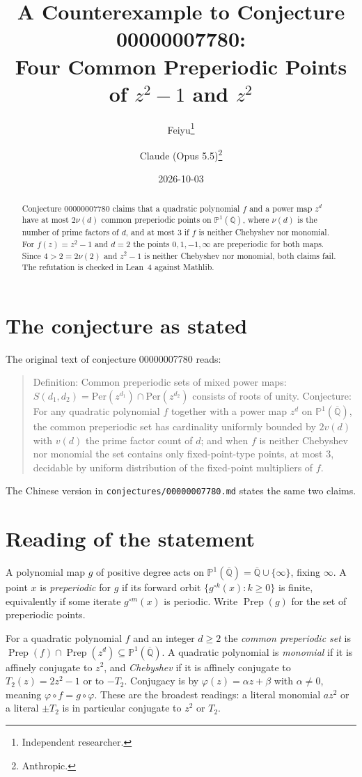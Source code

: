 \documentclass[11pt]{article}
\title{A Counterexample to Conjecture 00000007780:\\
Four Common Preperiodic Points of $z^2-1$ and $z^2$}
\author{%
  Feiyu\thanks{Independent researcher.}
  \and
  Claude (Opus 5.5)\thanks{Anthropic.}%
}
\date{2026-10-03}
\theoremstyle{plain}
\theoremstyle{definition}
\theoremstyle{remark}
\newcommand{\Qb}{\overline{\mathbb Q}}
\newcommand{\PP}{\mathbb P^1(\Qb)}
\newcommand{\Prep}{\operatorname{Prep}}
\begin{document}
\maketitle

\begin{abstract}
Conjecture 00000007780 claims that a quadratic polynomial $f$ and a power map $z^d$
have at most $2\nu(d)$ common preperiodic points on $\PP$, where $\nu(d)$ is the
number of prime factors of $d$, and at most $3$ if $f$ is neither Chebyshev nor
monomial. For $f(z)=z^2-1$ and $d=2$ the points $0,1,-1,\infty$ are preperiodic for
both maps. Since $4>2=2\nu(2)$ and $z^2-1$ is neither Chebyshev nor monomial, both
claims fail. The refutation is checked in Lean~4 against Mathlib.
\end{abstract}

\section{The conjecture as stated}

The original text of conjecture 00000007780 reads:

\begin{quote}
Definition: Common preperiodic sets of mixed power maps: $S(d_1,d_2) =
\mathrm{Per}(z^{d_1}) \cap \mathrm{Per}(z^{d_2})$ consists of roots of unity.
Conjecture: For any quadratic polynomial $f$ together with a power map $z^d$ on
$\mathbb P^1(\overline{\mathbb Q})$, the common preperiodic set has cardinality
uniformly bounded by $2 v(d)$ with $v(d)$ the prime factor count of $d$; and when $f$
is neither Chebyshev nor monomial the set contains only fixed-point-type points, at
most $3$, decidable by uniform distribution of the fixed-point multipliers of $f$.
\end{quote}

The Chinese version in \texttt{conjectures/00000007780.md} states the same two claims.

\section{Reading of the statement}

A polynomial map $g$ of positive degree acts on $\PP=\Qb\cup\{\infty\}$, fixing
$\infty$. A point $x$ is \emph{preperiodic} for $g$ if its forward orbit
$\{g^{\circ k}(x):k\ge0\}$ is finite, equivalently if some iterate $g^{\circ m}(x)$
is periodic. Write $\Prep(g)$ for the set of preperiodic points.

For a quadratic polynomial $f$ and an integer $d\ge2$ the \emph{common preperiodic
set} is $\Prep(f)\cap\Prep(z^d)\subseteq\PP$. A quadratic polynomial is
\emph{monomial} if it is affinely conjugate to $z^2$, and \emph{Chebyshev} if it is
affinely conjugate to $T_2(z)=2z^2-1$ or to $-T_2$. Conjugacy is by
$\varphi(z)=\alpha z+\beta$ with $\alpha\ne0$, meaning $\varphi\circ f=g\circ\varphi$.
These are the broadest readings: a literal monomial $az^2$ or a literal $\pm T_2$ is
in particular conjugate to $z^2$ or $T_2$.
\end{document}
